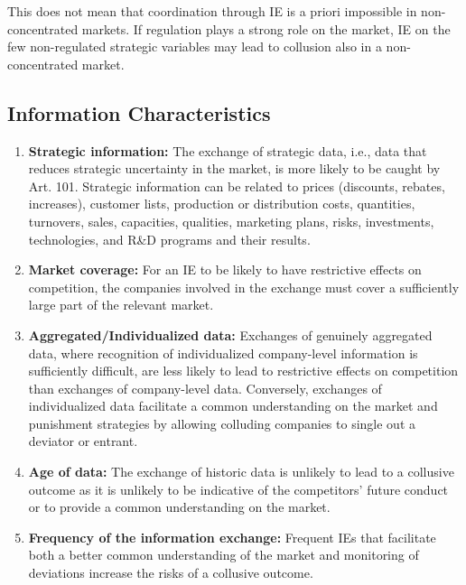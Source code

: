         This does not mean that coordination through IE is a priori impossible in non-concentrated markets. If regulation plays a strong role on the market, IE on the few non-regulated strategic variables may lead to collusion also in a non-concentrated market.

    \subsection{Information Characteristics}

        \begin{enumerate}
            \item \textbf{Strategic information:} The exchange of strategic data, i.e., data that reduces strategic uncertainty in the market, is more likely to be caught by Art. 101. Strategic information can be related to prices (discounts, rebates, increases), customer lists, production or distribution costs, quantities, turnovers, sales, capacities, qualities, marketing plans, risks, investments, technologies, and R\&D programs and their results.
                        
            \item \textbf{Market coverage:} For an IE to be likely to have restrictive effects on competition, the companies involved in the exchange must cover a sufficiently large part of the relevant market.
            
            \item \textbf{Aggregated/Individualized data:} Exchanges of genuinely aggregated data, where recognition of individualized company-level information is sufficiently difficult, are less likely to lead to restrictive effects on competition than exchanges of company-level data.  
            Conversely, exchanges of individualized data facilitate a common understanding on the market and punishment strategies by allowing colluding companies to single out a deviator or entrant.
            
            \item \textbf{Age of data:} The exchange of historic data is unlikely to lead to a collusive outcome as it is unlikely to be indicative of the competitors’ future conduct or to provide a common understanding on the market.
            
            \item \textbf{Frequency of the information exchange:} Frequent IEs that facilitate both a better common understanding of the market and monitoring of deviations increase the risks of a collusive outcome.
            

\end{enumerate}
